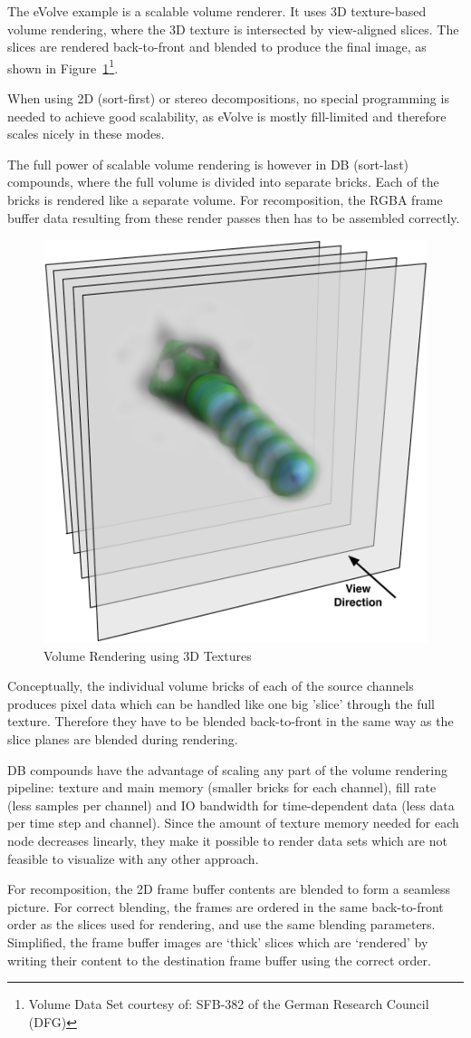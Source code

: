 \documentclass[10pt,a4]{scrartcl}
\newcommand{\fig}[1]{Figure~\ref{#1}}
\begin{document}
The \textsf{eVolve} example is a scalable volume renderer. It uses 3D
texture-based volume rendering, where the 3D texture is intersected by
view-aligned slices. The slices are rendered back-to-front and blended
to produce the final image, as shown in \fig{fSlices}\footnote{Volume
  Data Set courtesy of: SFB-382 of the German Research Council (DFG)}.

When using 2D (sort-first) or stereo decompositions, no special
programming is needed to achieve good scalability, as \textsf{eVolve} is
mostly fill-limited and therefore scales nicely in these modes. 

The full power of scalable volume rendering is however in DB (sort-last)
compounds, where the full volume is divided into separate bricks. Each
of the bricks is rendered like a separate volume. For recomposition, the
\textsf{RGBA} frame buffer data resulting from these render passes then
has to be assembled correctly. 

\begin{figure}
  \includegraphics[width=.382\textwidth]{images/slices.pdf}
  {\caption{\label{fSlices}Volume Rendering using 3D Textures}}
\end{figure}
Conceptually, the individual volume bricks of each of the source
channels produces pixel data which can be handled like one big 'slice'
through the full texture. Therefore they have to be blen\-ded
back-to-front in the same way as the slice planes are blended during
rendering.

DB compounds have the advantage of scaling any part of the volume
rendering pipeline: texture and main memory (smaller bricks for each
channel), fill rate (less samples per channel) and IO bandwidth for
time-dependent data (less data per time step and channel). Since the
amount of texture memory needed for each node decreases linearly, they
make it possible to render data sets which are not feasible to
visualize with any other approach.

For recomposition, the 2D frame buffer contents are blended to form a
seamless picture. For correct blending, the frames are ordered in the
same back-to-front order as the slices used for rendering, and use the
same blending parameters. Simplified, the frame buffer images are
`thick' slices which are `rendered' by writing their content to the
destination frame buffer using the correct order.
\end{document}
